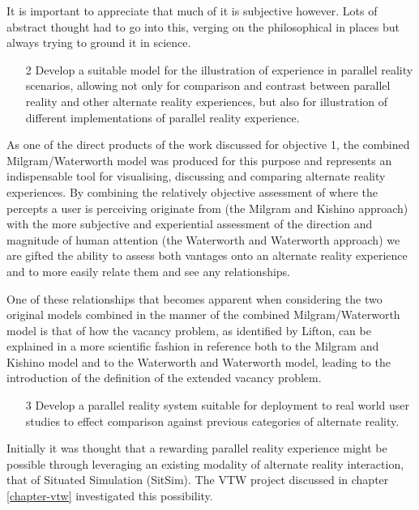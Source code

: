 It is important to appreciate that much of it is subjective however. Lots of abstract thought had to go into this, verging on the philosophical in places but always trying to ground it in science.

\begin{enumerate}
	\item[2] Develop a suitable model for the illustration of experience in parallel reality scenarios, allowing not only for comparison and contrast between parallel reality and other alternate reality experiences, but also for illustration of different implementations of parallel reality experience.
\end{enumerate}

As one of the direct products of the work discussed for objective 1, the combined Milgram/Waterworth model was produced for this purpose and represents an indispensable tool for visualising, discussing and comparing alternate reality experiences. By combining the relatively objective assessment of where the percepts a user is perceiving originate from (the Milgram and Kishino approach) with the more subjective and experiential assessment of the direction and magnitude of human attention (the Waterworth and Waterworth approach) we are gifted the ability to assess both vantages onto an alternate reality experience and to more easily relate them and see any relationships.

One of these relationships that becomes apparent when considering the two original models combined in the manner of the combined Milgram/Waterworth model is that of how the vacancy problem, as identified by Lifton, can be explained in a more scientific fashion in reference both to the Milgram and Kishino model and to the Waterworth and Waterworth model, leading to the introduction of the definition of the extended vacancy problem.

\begin{enumerate}
	\item[3] Develop a parallel reality system suitable for deployment to real world user studies to effect comparison against previous categories of alternate reality.
\end{enumerate}

Initially it was thought that a rewarding parallel reality experience might be possible through leveraging an existing modality of alternate reality interaction, that of Situated Simulation (SitSim). The VTW project discussed in chapter \ref{chapter-vtw} investigated this possibility.

